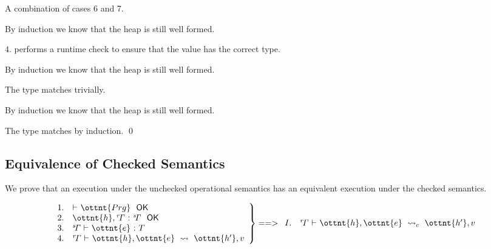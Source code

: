 
A combination of cases 6 and 7.



By induction we know that the heap is still well formed.

$4.$ performs a runtime check to ensure that the value has the correct
type.



By induction we know that the heap is still well formed.

The type matches trivially.



By induction we know that the heap is still well formed.

The type matches by induction.
\qed


\subsection{Equivalence of Checked Semantics}

We prove that an execution under the unchecked operational semantics has an
equivalent execution under the checked semantics.

\begin{theorem}
\label{enerj:thm:cs}
\[
\left.
\begin{array}{ll}
1. &  \textsf{$\vdash$} \  \ottnt{Prg} \ \  \textsf{OK} \\
2. &  \ottnt{h} ,  \mathit{ {^r}\!\Gamma} \  \textsf{:} \  \mathit{ {^s}\!\Gamma} \ \  \textsf{OK} \\
3. &  \mathit{ {^s}\!\Gamma} \  \textsf{$\vdash$} \  \ottnt{e} \  \textsf{:} \  T \\
4. &  \mathit{ {^r}\!\Gamma} \  \textsf{$\vdash$} \  \ottnt{h} ,  \ottnt{e} \ \leadsto\  \ottnt{h'} ,  v \\
\end{array}
\right\} ==>
\begin{array}{ll}
I. &  \mathit{ {^r}\!\Gamma} \  \textsf{$\vdash$} \  \ottnt{h} ,  \ottnt{e} \ \leadsto_{c}\  \ottnt{h'} ,  v \\
\end{array}
\]
\end{theorem}


